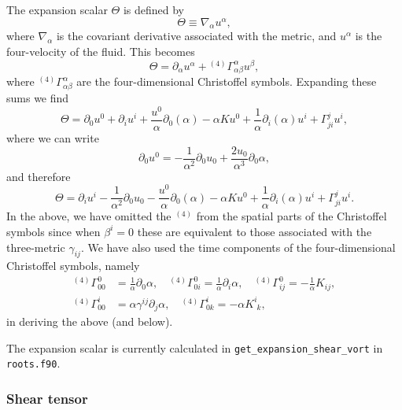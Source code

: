 \documentclass[a4paper]{article}
\newcommand{\ph}{\phantom}
\newcommand{\alp}{\alpha}
\newcommand{\Gam}{\Gamma}
\newcommand{\gam}{\gamma}
\newcommand{\pd}{\partial}
\begin{document}
The expansion scalar $\Theta$ is defined by
\begin{equation}\label{eq:expansion_scalar_defn}
	\Theta \equiv \nabla_\alp u^\alp,
\end{equation}
where $\nabla_\alp$ is the covariant derivative associated with the metric, and $u^\alp$ is the four-velocity of the fluid. This becomes
\begin{equation}
	\Theta = \pd_\alp u^\alp + {}^{(4)}\Gam^\alp_{\alp\beta} u^\beta,
\end{equation}
where ${}^{(4)}\Gam^\alp_{\alp\beta}$ are the four-dimensional Christoffel symbols. Expanding these sums we find 
\begin{equation}
	\Theta = \pd_0 u^0 + \pd_i u^i + \frac{u^0}{\alp} \pd_0 ( \alp ) - \alp K u^0 +   \frac{1}{\alp} \pd_i ( \alp ) u^i + \Gam^j_{ji} u^i,
\end{equation}
where we can write
\begin{equation}\label{eq:pd0u0}
	\pd_0 u^0 = - \frac{1}{\alp^2} \pd_0 u_0 + \frac{2u_0}{\alp^3} \pd_0 \alp,
\end{equation}
and therefore
\begin{equation}
	\Theta = \pd_i u^i - \frac{1}{\alp^2} \pd_0 u_0 - \frac{u^0 }{\alp} \pd_0 ( \alp )- \alp K u^0 +   \frac{1}{\alp} \pd_i ( \alp ) u^i + \Gam^j_{ji} u^i.
\end{equation}
In the above, we have omitted the ${}^{(4)}$ from the spatial parts of the Christoffel symbols since when $\beta^i=0$ these are equivalent to those associated with the three-metric $\gam_{ij}$. We have also used the time components of the four-dimensional Christoffel symbols, namely
\begin{align}
	{}^{(4)}\Gamma^0_{00} &= \frac{1}{\alp}\pd_0 \alp, \quad {}^{(4)}\Gamma^0_{0i} = \frac{1}{\alp}\pd_i\alp, \quad {}^{(4)}\Gamma^0_{ij} = - \frac{1}{\alp} K_{ij}, \\
	{}^{(4)}\Gamma^i_{00} &= \alp \gam^{ij} \pd_j \alp, \quad {}^{(4)}\Gamma^i_{0k} = -\alp K^i_{\ph{i}k},
\end{align}
in deriving the above (and below).

The expansion scalar is currently calculated in \texttt{get\_expansion\_shear\_vort} in \texttt{roots.f90}.

\subsubsection{Shear tensor}
\end{document}
